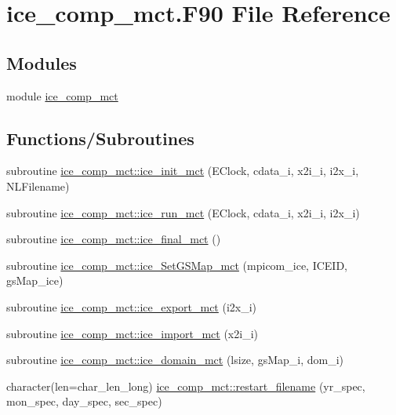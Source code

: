 \hypertarget{ice__comp__mct_8F90}{
\section{ice\_\-comp\_\-mct.F90 File Reference}
\label{ice__comp__mct_8F90}
}
\subsection*{Modules}
\begin{DoxyCompactItemize}
\item 
module \hyperlink{namespaceice__comp__mct}{ice\_\-comp\_\-mct}
\end{DoxyCompactItemize}
\subsection*{Functions/Subroutines}
\begin{DoxyCompactItemize}
\item 
subroutine \hyperlink{namespaceice__comp__mct_aea0306f80417faf23e2153503a468ed0}{ice\_\-comp\_\-mct::ice\_\-init\_\-mct} (EClock, cdata\_\-i, x2i\_\-i, i2x\_\-i, NLFilename)
\item 
subroutine \hyperlink{namespaceice__comp__mct_a7e9300fd6b2392c92d54b05f84464939}{ice\_\-comp\_\-mct::ice\_\-run\_\-mct} (EClock, cdata\_\-i, x2i\_\-i, i2x\_\-i)
\item 
subroutine \hyperlink{namespaceice__comp__mct_acd10abc7ef002e1d5e3223ce079bad2b}{ice\_\-comp\_\-mct::ice\_\-final\_\-mct} ()
\item 
subroutine \hyperlink{namespaceice__comp__mct_a44b387bdc97aa66b1bd25afd2b68ec09}{ice\_\-comp\_\-mct::ice\_\-SetGSMap\_\-mct} (mpicom\_\-ice, ICEID, gsMap\_\-ice)
\item 
subroutine \hyperlink{namespaceice__comp__mct_a0b623ba08317afe1cf24e68494b092da}{ice\_\-comp\_\-mct::ice\_\-export\_\-mct} (i2x\_\-i)
\item 
subroutine \hyperlink{namespaceice__comp__mct_a64a861144b6d897f984676031622b7f9}{ice\_\-comp\_\-mct::ice\_\-import\_\-mct} (x2i\_\-i)
\item 
subroutine \hyperlink{namespaceice__comp__mct_a13b99c3351533da77b875c4de8cf6cf8}{ice\_\-comp\_\-mct::ice\_\-domain\_\-mct} (lsize, gsMap\_\-i, dom\_\-i)
\item 
character(len=char\_\-len\_\-long) \hyperlink{namespaceice__comp__mct_a06dea082678c790cef2bcb75c338b6d2}{ice\_\-comp\_\-mct::restart\_\-filename} (yr\_\-spec, mon\_\-spec, day\_\-spec, sec\_\-spec)
\end{DoxyCompactItemize}

